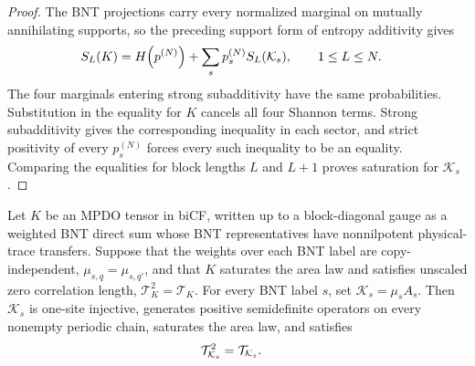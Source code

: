 \begin{proof}\leanok
    The BNT projections carry every normalized marginal on mutually
    annihilating supports, so the preceding support form of entropy
    additivity gives
    \begin{align}
        S_L(K)
         & =H\!\left(p^{(N)}\right)
        +\sum_s p_s^{(N)}S_L(\mathcal K_s),
        \qquad 1\leq L\leq N.
        \notag
    \end{align}
    The four marginals entering strong subadditivity have the same
    probabilities. Substitution in the equality for $K$ cancels all four
    Shannon terms. Strong subadditivity gives the corresponding inequality
    in each sector, and strict positivity of every $p_s^{(N)}$ forces every
    such inequality to be an equality. Comparing the equalities for block
    lengths $L$ and $L+1$ proves saturation for $\mathcal K_s$.
\end{proof}

\begin{lemma}
    \label{thm:mpdo_absorbed_bnt_sector_caseii_analytic_properties}
    \leanok
    Let $K$ be an MPDO tensor in biCF, written up to a block-diagonal
    gauge as a weighted BNT direct sum whose BNT representatives have
    nonnilpotent physical-trace transfers. Suppose that the weights over each
    BNT label are copy-independent,
    $\mu_{s,q}=\mu_{s,q'}$, and that $K$ saturates the area law and satisfies
    unscaled zero correlation length, $\mathcal T_K^2=\mathcal T_K$. For every
    BNT label $s$, set $\mathcal K_s=\mu_sA_s$. Then
    $\mathcal K_s$ is one-site injective, generates positive semidefinite
    operators on every nonempty periodic chain, saturates the area law, and
    satisfies
    \begin{align}
        \mathcal T_{\mathcal K_s}^{2}
         & =\mathcal T_{\mathcal K_s}.
        \notag
    \end{align}
\end{lemma}

